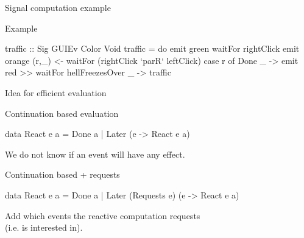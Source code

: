 \documentclass{beamer}
\begin{document}
\begin{frame}{Signal computation example}

\begin{block}{Example}
\vspace{-0.4cm}
\begin{center}
\end{center}
\vspace{-0.6cm}
\begin{code}
traffic :: Sig GUIEv Color Void
traffic = 
  do  emit green 
      waitFor rightClick
      emit orange
      (r,_) <- waitFor (rightClick `parR` leftClick)
      case r of
       Done _  ->  emit red >> waitFor hellFreezesOver 
       _       ->  traffic
\end{code}
\setlength{\mathindent}{\tmathindenta}
\vspace{-0.8cm}
\end{block}
\end{frame}

\begin{frame}{Idea for efficient evaluation}

\begin{block}{Continuation based evaluation}

\begin{code}
data React e a = Done a | Later (e -> React e a) 
\end{code}
We do not know if an event will have any effect.
\end{block}

\begin{block}{Continuation based + requests}
\begin{code}
data React e a = Done a | Later (Requests e) (e -> React e a) 
\end{code}
Add which events the reactive computation \alert{requests}\\ (i.e. is interested in).
\end{block}
\end{frame}
\end{document}
